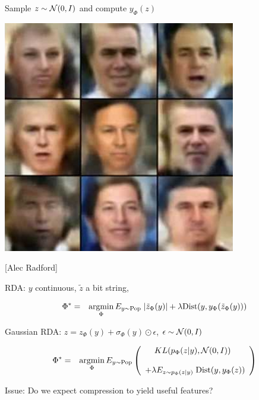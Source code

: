 {

\centerline{Sample {\color{red} $z \sim {\cal N}(0,I)$} and compute {\color{red} $y_\Phi(z)$}}
\vfill
\centerline{\includegraphics[width = 4in]{../images/VariationalFaces}}
\centerline{[Alec Radford]}



RDA: $y$ continuous, $\tilde{z}$ a bit string,

{\color{red}
\begin{eqnarray*}
\Phi^* &  = &  \operatorname*{argmin}_\Phi E_{y \sim \mathrm{Pop}} \;|\tilde{z}_\Phi(y)| + \lambda \mathrm{Dist}(y,y_\Phi(\tilde{z}_\Phi(y)))
\end{eqnarray*}
}

\vfill
Gaussian RDA: {\color{red} $z = z_\Phi(y) + \sigma_\Phi(y) \odot \epsilon$,\hspace{2em} $\epsilon \sim {\cal N}(0,I)$}

{\color{red}
\begin{eqnarray*}
\Phi^* & = & \operatorname*{argmin}_\Phi E_{y \sim \mathrm{Pop}}\left(\begin{array}{l}\;\;\; \;KL(p_\Phi(z|y),{\cal N}(0,I)) \\ \\ + \lambda E_{z\sim p_\Phi(z|y)}\; \mathrm{Dist}(y,y_\Phi(z)) \end{array}\right)
\end{eqnarray*}
}

\vfill
Issue: Do we expect compression to yield useful features?


}



